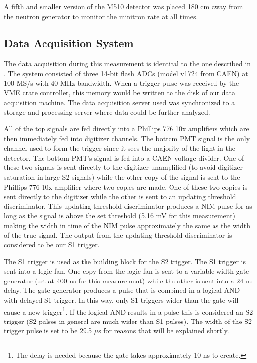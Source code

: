 A fifth and smaller version of the M510 detector was placed 180 cm away from the neutron generator to monitor the minitron rate at all times.



\subsection{Data Acquisition System}
\label{sec:nerix_daq_trigger}

The data acquisition during this measurement is identical to the one described in .  The system consisted of three 14-bit flash ADCs (model v1724 from CAEN) at 100 MS/s with 40 MHz bandwidth.  When a trigger pulse was received by the VME crate controller, this memory would be written to the disk of our data acquisition machine.  The data acquisition server used was synchronized to a storage and processing server where data could be further analyzed.

All of the top signals are fed directly into a Phillips 776 10x amplifiers which are then immediately fed into digitizer channels.  The bottom PMT signal is the only channel used to form the trigger since it sees the majority of the light in the detector.  The bottom PMT's signal is fed into a CAEN voltage divider.  One of these two signals is sent directly to the digitizer unamplified (to avoid digitizer saturation in large S2 signals) while the other copy of the signal is sent to the Phillips 776 10x amplifier where two copies are made.  One of these two copies is sent directly to the digitizer while the other is sent to an updating threshold discriminator.  This updating threshold discriminator produces a NIM pulse for as long as the signal is above the set threshold (5.16 mV for this measurement) making the width in time of the NIM pulse approximately the same as the width of the true signal.  The output from the updating threshold discriminator is considered to be our S1 trigger.  

The S1 trigger is used as the building block for the S2 trigger.  The S1 trigger is sent into a logic fan.  One copy from the logic fan is sent to a variable width gate generator (set at 400 ns for this measurement) while the other is sent into a 24 ns delay.  The gate generator produces a \nimbar{} pulse that is combined in a logical AND with delayed S1 trigger.  In this way, only S1 triggers wider than the gate will cause a new trigger\footnote{The delay is needed because the gate takes approximately 10 ns to create.}.  If the logical AND results in a pulse this is considered an S2 trigger (S2 pulses in general are much wider than S1 pulses).  The width of the S2 trigger pulse is set to be 29.5 $\mu$s for reasons that will be explained shortly.

